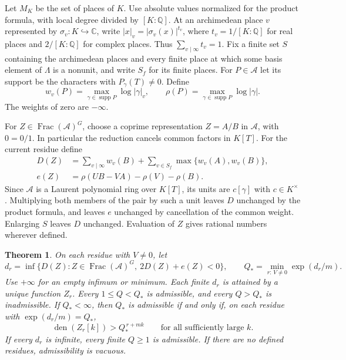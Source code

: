 \documentclass[11pt,a4paper,reqno]{amsart}
\newtheorem{theorem}{Theorem}[section]
\theoremstyle{definition}
\theoremstyle{remark}
\numberwithin{equation}{section}
\begin{document}
Let \(M_K\) be the set of places of \(K\). Use absolute values
normalized for the product formula, with local degree divided by
\([K:\mathbb Q]\). At an archimedean place \(v\) represented by
\(\sigma_v:K\hookrightarrow\mathbb C\), write
\(|x|_v=|\sigma_v(x)|^{t_v}\), where \(t_v=1/[K:\mathbb Q]\) for real
places and \(2/[K:\mathbb Q]\) for complex places. Thus
\(\sum_{v\mid\infty}t_v=1\). Fix a finite set \(S\) containing the
archimedean places and every finite place at which some basis element
of \(\Lambda\) is a nonunit, and write \(S_f\) for its finite places.
For \(P\in\mathcal A\) let its support be the characters with
\(P_\gamma(T)\ne0\). Define
\[
 w_v(P)=\max_{\gamma\in\operatorname{supp}P}\log|\gamma|_v,\qquad
 \rho(P)=\max_{\gamma\in\operatorname{supp}P}\log|\gamma|.
\]
The weights of zero are \(-\infty\).

For \(Z\in\operatorname{Frac}(\mathcal A)^G\), choose a coprime
representation \(Z=A/B\) in \(\mathcal A\), with \(0=0/1\). In
particular the reduction cancels common factors in \(K[T]\).
For the current residue define
\begin{align}
 D(Z)&=\sum_{v\mid\infty}w_v(B)
       +\sum_{v\in S_f}\max\{w_v(A),w_v(B)\}, \label{eq:alg-D}\\
 e(Z)&=\rho(UB-VA)-\rho(V)-\rho(B). \label{eq:alg-e}
\end{align}
Since \(\mathcal A\) is a Laurent polynomial ring over \(K[T]\), its
units are \(c[\gamma]\) with \(c\in K^\times\). Multiplying both
members of the pair by such a unit leaves \(D\) unchanged by the
product formula, and leaves \(e\) unchanged by cancellation of the
common weight. Enlarging \(S\) leaves \(D\) unchanged. Evaluation of
\(Z\) gives rational numbers wherever defined.

\begin{theorem}\label{thm:algcut}
On each residue with \(V\ne0\), let
\begin{equation}\label{eq:alg-variational}
 d_r=\inf\{D(Z):Z\in\operatorname{Frac}(\mathcal A)^G,\
                       2D(Z)+e(Z)<0\},
 \qquad
 Q_*=\min_{r:\,V\ne0}\exp(d_r/m).
\end{equation}
Use \(+\infty\) for an empty infimum or minimum. Each finite \(d_r\)
is attained by a unique function \(Z_r\).
Every \(1\le Q<Q_*\) is admissible, and every \(Q>Q_*\) is
inadmissible. If \(Q_*<\infty\), then \(Q_*\) is admissible if and
only if, on each residue with \(\exp(d_r/m)=Q_*\),
\begin{equation}\label{eq:alg-endpoint}
 \operatorname{den}(Z_r[k])>Q_*^{\,r+mk}
 \qquad\text{for all sufficiently large }k.
\end{equation}
If every \(d_r\) is infinite, every finite \(Q\ge1\) is
admissible. If there are no defined residues, admissibility is
vacuous.
\end{theorem}
\end{document}
